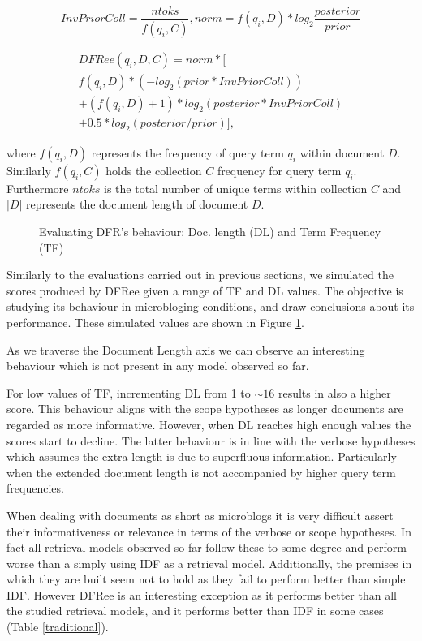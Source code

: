 \begin{equation}
InvPriorColl = \frac{ntoks}{f(q_i, C)}, norm = f(q_i, D)*log_2{\frac{posterior}{prior}}
\end{equation}

\begin{multline}
DFRee(q_i,D,C) = norm * [                    \\
f(q_i, D)*(-log_2(prior*InvPriorColl))       \\
+(f(q_i, D)+1)*log_2(posterior*InvPriorColl) \\
+ 0.5*log_2(posterior/prior)],
\end{multline}

where \(f(q_i, D)\) represents the frequency of query term \(q_i\) within document \(D\). Similarly \(f(q_i, C)\) holds the collection \(C\) frequency for query term \(q_i\). Furthermore \(ntoks\) is the total number of unique terms within collection \(C\) and \(|D|\) represents the document length of document \(D\).

\begin{figure}
	\centering
	\caption{Evaluating DFR's behaviour: Doc. length (DL) and Term Frequency (TF)}
	
	\label{dfrTFDLcomp}
\end{figure} 

Similarly to the evaluations carried out in previous sections, we simulated the scores produced by DFRee given a range of TF and DL values. The objective is studying its behaviour in microbloging conditions, and draw conclusions about its performance. These simulated values are shown in Figure \ref{dfrTFDLcomp}.

As we traverse the Document Length axis we can observe an interesting behaviour which is not present in any model observed so far. 

For low values of TF, incrementing DL from 1 to $\sim16$ results in also a higher score. This behaviour aligns with the scope hypotheses as longer documents are regarded as more informative. However, when DL reaches high enough values the scores start to decline. The latter behaviour is in line with the verbose hypotheses which assumes the extra length is due to superfluous information. Particularly when the extended document length is not accompanied by higher query term frequencies.

When dealing with documents as short as microblogs it is very difficult assert their informativeness or relevance in terms of the verbose or scope hypotheses. In fact all retrieval models observed so far follow these to some degree and perform worse than a simply using IDF as a retrieval model. Additionally, the premises in which they are built seem not to hold as they fail to perform better than simple IDF. However DFRee is an interesting exception as it performs better than all the studied retrieval models, and it performs better than IDF in some cases (Table \ref{traditional}).

